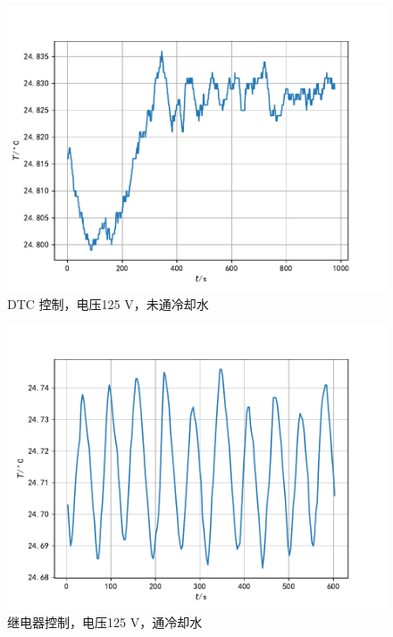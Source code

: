 \documentclass[12pt]{ctexart}
\numberwithin{equation}{section}
\begin{document}
\begin{figure}[!h]
    \centering
    \includegraphics[scale=0.68]{Figure_2.pdf}
    \caption{DTC 控制，电压125 V，未通冷却水}
\end{figure}

\begin{figure}[!h]
    \centering
    \includegraphics[scale=0.68]{Figure_3.pdf}
    \caption{继电器控制，电压125 V，通冷却水}
\end{figure}
\end{document}
